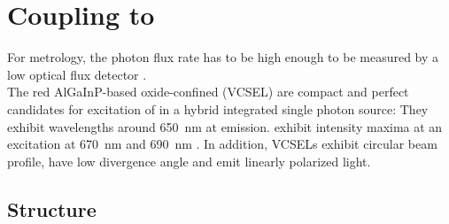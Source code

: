 
\section[VCSELs]{Coupling \Nds to \Vcsels} \label{sec::coupling_vcsel}

	For metrology, the photon flux rate has to be high enough to be measured by a low optical flux detector \cite{Vaigu2017}.
	\\
	The red AlGaInP-based oxide-confined \vcsels (VCSEL) are compact and perfect candidates for excitation of \sivs in a hybrid integrated single photon source: 
	They exhibit wavelengths around \SI{650}{nm} at \cw emission.
	\sivs exhibit intensity maxima at an excitation at \SI{670}{nm} and \SI{690}{nm} \cite{}. 
	In addition, VCSELs exhibit circular beam profile, have low divergence angle and emit linearly polarized light.

	\subsection{\Vcsel Structure}

